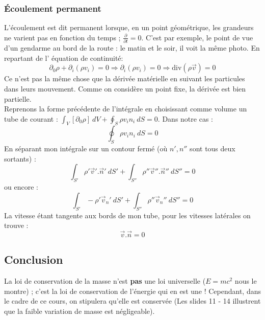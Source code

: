         \subsubsection{Écoulement permanent}
        L'écoulement est dit permanent lorsque, en un point géométrique, les grandeurs ne varient pas en
        fonction du temps ; $\frac{\partial}{\partial t} = 0$. C'est par exemple, le point de vue d'un 
        gendarme au bord de la route : le matin et le soir, il voit la même photo. En repartant de l'
        équation de continuité:
        \begin{equation}
        \partial_0\rho + \partial_i(\rho v_i) = 0 \Rightarrow \partial_i(\rho v_i) = 0 \Rightarrow
        \text{div}(\rho\vec v) = 0
        \end{equation}
        Ce n'est pas la même chose que la dérivée matérielle en suivant les particules dans leurs 
        mouvement. Comme on considère un point fixe, la dérivée est bien partielle.\\
        
        Reprenons la forme précédente de l'intégrale en choisissant comme volume un tube de courant : $
        \int_V [\partial_0\rho]\ dV + \oint_S \rho v_in_i\ dS = 0$. Dans notre cas :
        \begin{equation}
        \oint_S \rho v_in_i\ dS = 0
        \end{equation}
        En séparant mon intégrale sur un contour fermé (où $n',n''$ sont tous deux sortants) :
        \begin{equation}
        \int_{S'} \rho'\vec v'.\vec n'\ dS' + \int_{S''} \rho''\vec v''.\vec n''\ dS'' = 0
        \end{equation}
        ou encore :
        \begin{equation}
        \int_{S'} -\rho'\vec v_n'\ dS' + \int_{S''} \rho''\vec v_n''\ dS'' = 0
        \end{equation}
        La vitesse étant tangente aux bords de mon tube, pour les vitesses latérales on trouve : 
        \begin{equation}
        \vec v.\vec n =0
        \end{equation}
        
        
    \subsection{Conclusion}
    La loi de conservation de la masse n'est \textbf{pas} une loi universelle ($E = mc^2$ nous le
    montre) ; c'est la loi de conservation de l'énergie qui en est une ! Cependant, dans le cadre
    de ce cours, on stipulera qu'elle est conservée (Les slides 11 - 14 illustrent que la faible
    variation de masse est négligeable).
    
